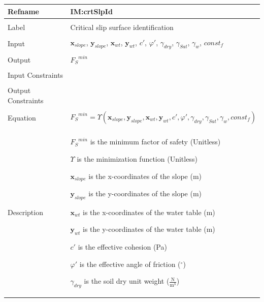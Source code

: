 \documentclass[12pt]{article}
\begin{document}
\noindent \begin{minipage}{\textwidth}
\begin{tabular}{p{} p{}}
\toprule \textbf{Refname} & \textbf{IM:crtSlpId}
\label{IM:crtSlpId}
\\ \midrule \\
Label & Critical slip surface identification
\\ \midrule \\
Input & ${\mathbf{x}_{slope}}$, ${\mathbf{y}_{slope}}$, ${\mathbf{x}_{wt}}$, ${\mathbf{y}_{wt}}$, $c'$, $φ'$, ${γ_{dry}}$, ${γ_{Sat}}$, ${γ_{w}}$, $const_f$
\\ \midrule \\
Output & ${{F_{S}}^{min}}$
\\ \midrule \\
Input Constraints & 
\\ \midrule \\
Output Constraints & 
\\ \midrule \\
Equation & \begin{displaymath}
           {{F_{S}}^{min}}=Υ\left({\mathbf{x}_{slope}},{\mathbf{y}_{slope}},{\mathbf{x}_{wt}},{\mathbf{y}_{wt}},c',φ',{γ_{dry}},{γ_{Sat}},{γ_{w}},const_f\right)
           \end{displaymath}
\\ \midrule \\
Description & \begin{symbDescription}
              \item{${{F_{S}}^{min}}$ is the minimum factor of safety (Unitless)}
              \item{$Υ$ is the minimization function (Unitless)}
              \item{${\mathbf{x}_{slope}}$ is the x-coordinates of the slope (m)}
              \item{${\mathbf{y}_{slope}}$ is the y-coordinates of the slope (m)}
              \item{${\mathbf{x}_{wt}}$ is the x-coordinates of the water table (m)}
              \item{${\mathbf{y}_{wt}}$ is the y-coordinates of the water table (m)}
              \item{$c'$ is the effective cohesion (Pa)}
              \item{$φ'$ is the effective angle of friction (${}^{\circ}$)}
              \item{${γ_{dry}}$ is the soil dry unit weight ($\frac{\text{N}}{\text{m}^{3}}$)}

\end{symbDescription}
\end{tabular}
\end{minipage}
\end{document}
